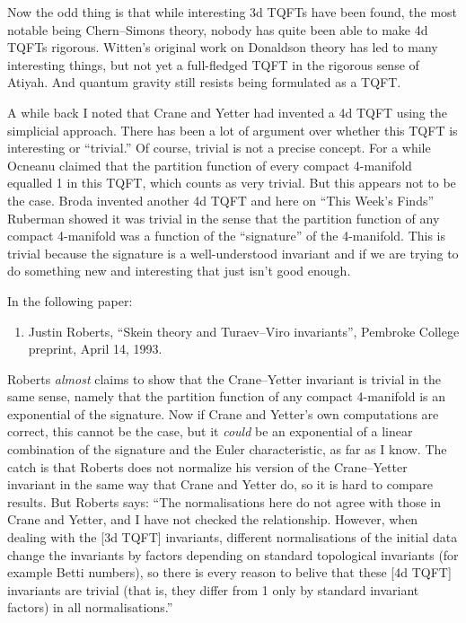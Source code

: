 \documentclass{article}
\def\tightlist{}
\begin{document}
Now the odd thing is that while interesting 3d TQFTs have been found,
the most notable being Chern--Simons theory, nobody has quite been able
to make 4d TQFTs rigorous. Witten's original work on Donaldson theory
has led to many interesting things, but not yet a full-fledged TQFT in
the rigorous sense of Atiyah. And quantum gravity still resists being
formulated as a TQFT.

A while back I noted that Crane and Yetter had invented a 4d TQFT using
the simplicial approach. There has been a lot of argument over whether
this TQFT is interesting or ``trivial.'' Of course, trivial is not a
precise concept. For a while Ocneanu claimed that the partition function
of every compact 4-manifold equalled 1 in this TQFT, which counts as
very trivial. But this appears not to be the case. Broda invented
another 4d TQFT and here on ``This Week's Finds'' Ruberman showed it was
trivial in the sense that the partition function of any compact
4-manifold was a function of the ``signature'' of the 4-manifold. This
is trivial because the signature is a well-understood invariant and if
we are trying to do something new and interesting that just isn't good
enough.

In the following paper:

\begin{enumerate}
\def\labelenumi{\arabic{enumi})}
\tightlist
\item
   Justin Roberts, ``Skein theory and Turaev--Viro invariants'',
  Pembroke College preprint, April 14, 1993.
\end{enumerate}

Roberts \emph{almost} claims to show that the Crane--Yetter invariant is
trivial in the same sense, namely that the partition function of any
compact 4-manifold is an exponential of the signature. Now if Crane and
Yetter's own computations are correct, this cannot be the case, but it
\emph{could} be an exponential of a linear combination of the signature
and the Euler characteristic, as far as I know. The catch is that
Roberts does not normalize his version of the Crane--Yetter invariant in
the same way that Crane and Yetter do, so it is hard to compare results.
But Roberts says: ``The normalisations here do not agree with those in
Crane and Yetter, and I have not checked the relationship. However, when
dealing with the {[}3d TQFT{]} invariants, different normalisations of
the initial data change the invariants by factors depending on standard
topological invariants (for example Betti numbers), so there is every
reason to belive that these {[}4d TQFT{]} invariants are trivial (that
is, they differ from 1 only by standard invariant factors) in all
normalisations.''
\end{document}
